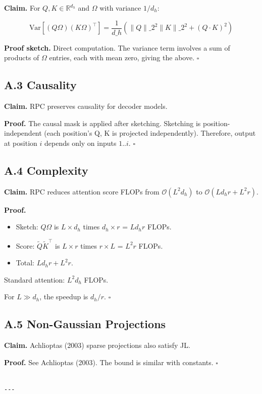 \textbf{Claim.} For $Q, K \in \mathbb{R}^{d_h}$ and $\Omega$ with variance $1/d_h$:

\[
\text{Var}[(Q\Omega)(K\Omega)^\top] = \frac{1}{d\_h} \left(\|Q\|\_2^2 \|K\|\_2^2 + (Q \cdot K)^2\right)
\tag{A.2}
\]

\textbf{Proof sketch.} Direct computation. The variance term involves a sum of products of $\Omega$ entries, each with mean zero, giving the above. $\square$

\subsection{A.3 Causality}

\textbf{Claim.} RPC preserves causality for decoder models.

\textbf{Proof.} The causal mask is applied after sketching. Sketching is 
position-independent (each position's Q, K is projected independently). 
Therefore, output at position $i$ depends only on inputs $1..i$. $\square$

\subsection{A.4 Complexity}

\textbf{Claim.} RPC reduces attention score FLOPs from $\mathcal{O}(L^2 d_h)$ 
to $\mathcal{O}(L d_h r + L^2 r)$.

\textbf{Proof.}
\begin{itemize}
\item Sketch: $Q \Omega$ is $L \times d_h$ times $d_h \times r$ = $L d_h r$ FLOPs.
\item Score: $\tilde{Q} \tilde{K}^\top$ is $L \times r$ times $r \times L$ = $L^2 r$ FLOPs.
\item Total: $L d_h r + L^2 r$.

\end{itemize}
Standard attention: $L^2 d_h$ FLOPs.

For $L \gg d_h$, the speedup is $d_h / r$. $\square$

\subsection{A.5 Non-Gaussian Projections}

\textbf{Claim.} Achlioptas (2003) sparse projections also satisfy JL.

\textbf{Proof.} See Achlioptas (2003). The bound is similar with constants. $\square$
\begin{lstlisting}

---
\end{lstlisting}